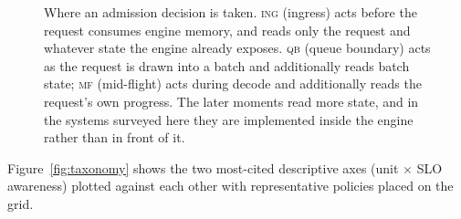 \begin{figure}[htbp]
{\begin{tikzpicture}
\end{tikzpicture}%
}
\caption{Where an admission decision is taken. \textsc{ing} (ingress) acts before the request consumes engine memory, and reads only the request and whatever state the engine already exposes. \textsc{qb} (queue boundary) acts as the request is drawn into a batch and additionally reads batch state; \textsc{mf} (mid-flight) acts during decode and additionally reads the request's own progress. The later moments read more state, and in the systems surveyed here they are implemented inside the engine rather than in front of it.}
\label{fig:moments}
\end{figure}

Figure~\ref{fig:taxonomy} shows the two most-cited descriptive axes
(unit $\times$ SLO awareness) plotted against each other with
representative policies placed on the grid.


